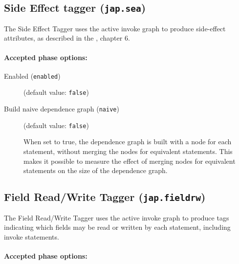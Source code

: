 \documentclass{article}
\begin{document}
\subsection{Side Effect tagger ({\tt jap.sea})}


\par

The Side Effect Tagger
uses the active invoke graph to produce side-effect attributes, as
described in the , chapter 6.


\paragraph{Accepted phase options:} 

\begin{description}

\item[Enabled ({\tt enabled})]
(default value: {\tt false})






\item[Build naive dependence graph ({\tt naive})]
(default value: {\tt false})





\par

When set to true, the dependence graph is built with a node for
each statement, without merging the nodes for equivalent
statements. This makes it possible to measure the effect of
merging nodes for equivalent statements on the size of the
dependence graph.



\end{description}

\subsection{Field Read/Write Tagger ({\tt jap.fieldrw})}


\par

The Field Read/Write Tagger uses the active invoke graph to
produce tags indicating which fields may be read or written by
each statement, including invoke statements.


\paragraph{Accepted phase options:} 
\end{document}

